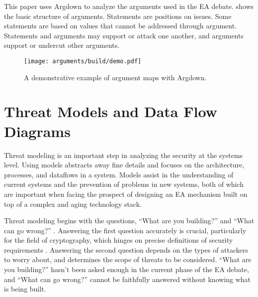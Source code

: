 This paper uses Argdown to analyze the arguments used in the \ac{EA} debate.  shows the basic
structure of arguments. Statements are positions on issues. Some statements are based on values that cannot be addressed
through argument. Statements and arguments may support or attack one another, and arguments support or undercut other
arguments.

\begin{figure}[ht]
    \centering\CaptionFontSize
    \texttt{[image: arguments/build/demo.pdf]}
    \caption[Argdown Demo]{A demonstrative example of argument maps with Argdown.}
    \label{fig-args-demo}
\end{figure}




\section{Threat Models and Data Flow Diagrams}
\label{sec-threat-model-intro}

Threat modeling is an important step in analyzing the security at the systems level. Using models abstracts away fine
details and focuses on the architecture, processes, and dataflows in a system. Models assist in the understanding of
current systems and the prevention of problems in new systems, both of which are important when facing the prospect of
designing an \ac{EA} mechanism built on top of a complex and aging technology stack.

Threat modeling begins with the questions, ``What are you building?'' and ``What can go wrong?''
\cite{shostack_threat_2014}. Answering the first question accurately is crucial, particularly for the field of
cryptography, which hinges on precise definitions of security requirements \cite{varia_2018}. Answering the second
question depends on the types of attackers to worry about, and determines the scope of threats to be considered. ``What
are you building?'' hasn't been asked enough in the current phase of the \ac{EA} debate, and ``What can go wrong?''
cannot be faithfully answered without knowing what is being built.

